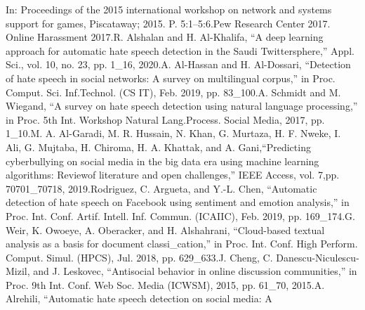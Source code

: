 \documentclass{letter}
\begin{document}
\begin{multicols}{2}
\begin{scriptsize}
In: Proceedings of the 2015 international workshop on network 
and systems support for games, Piscataway; 2015. P. 5:1–5:6.\newline \newline
[17] Pew Research Center 2017. Online Harassment 2017.\newline \newline
[18] R. Alshalan and H. Al-Khalifa, ``A deep learning approach for 
automatic hate speech detection in the Saudi Twittersphere,'' 
Appl. Sci., vol. 10, no. 23, pp. 1\_16, 2020.\newline \newline
[19] A. Al-Hassan and H. Al-Dossari, ``Detection of hate speech in
social networks: A survey on multilingual corpus,'' in Proc. 
Comput. Sci. Inf.Technol. (CS IT), Feb. 2019, pp. 83\_100.\newline \newline
[20] A. Schmidt and M. Wiegand, ``A survey on hate speech detection 
using natural language processing,'' in Proc. 5th Int. Workshop 
Natural Lang.Process. Social Media, 2017, pp. 1\_10.\newline \newline
[21] M. A. Al-Garadi, M. R. Hussain, N. Khan, G. Murtaza, H. F. 
Nweke, I. Ali, G. Mujtaba, H. Chiroma, H. A. Khattak, and A. 
Gani,``Predicting cyberbullying on social media in the big data 
era using machine learning algorithms: Reviewof literature and 
open challenges,'' IEEE Access, vol. 7,pp. 70701\_70718, 2019.\newline \newline
[22] Rodriguez, C. Argueta, and Y.-L. Chen, ``Automatic detection of 
hate speech on Facebook using sentiment and emotion analysis,'' 
in Proc. Int. Conf. Artif. Intell. Inf. Commun. (ICAIIC), Feb. 2019, 
pp. 169\_174.\newline \newline
[23] G. Weir, K. Owoeye, A. Oberacker, and H. Alshahrani, 
``Cloud-based textual analysis as a basis for document
classi\_cation,'' in Proc. Int. Conf. High Perform. Comput. Simul. 
(HPCS), Jul. 2018, pp. 629\_633.\newline \newline
[24] J. Cheng, C. Danescu-Niculescu-Mizil, and J. Leskovec, 
``Antisocial behavior in online discussion communities,'' in Proc. 
9th Int. Conf. Web Soc. Media (ICWSM), 2015, pp. 61\_70, 2015.\newline \newline
[25] A. Alrehili, ``Automatic hate speech detection on social media: A 

\end{scriptsize}
\end{multicols}
\end{document}
